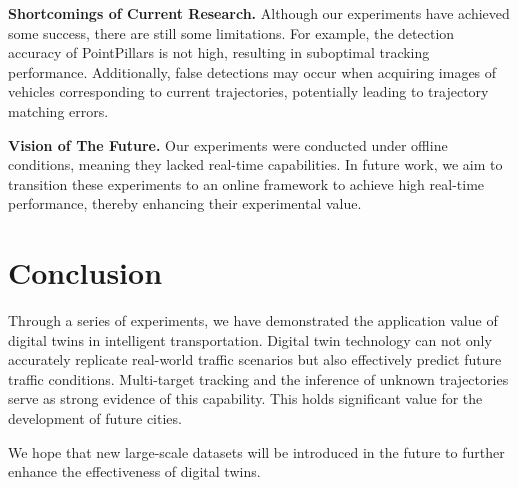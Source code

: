 \documentclass[lettersize,journal]{IEEEtran}
\begin{document}
\textbf{Shortcomings of Current Research.}
Although our experiments have achieved some success, there are still some limitations. 
For example, the detection accuracy of PointPillars is not high, resulting in suboptimal tracking performance. 
Additionally, false detections may occur when acquiring images of vehicles corresponding to current trajectories, potentially leading to trajectory matching errors.

\textbf{Vision of The Future.}
Our experiments were conducted under offline conditions, meaning they lacked real-time capabilities. 
In future work, we aim to transition these experiments to an online framework to achieve high real-time performance, thereby enhancing their experimental value.


\section{Conclusion}

Through a series of experiments, we have demonstrated the application value of digital twins in intelligent transportation. 
Digital twin technology can not only accurately replicate real-world traffic scenarios but also effectively predict future traffic conditions. 
Multi-target tracking and the inference of unknown trajectories serve as strong evidence of this capability. 
This holds significant value for the development of future cities.

We hope that new large-scale datasets will be introduced in the future to further enhance the effectiveness of digital twins.




\end{document}
